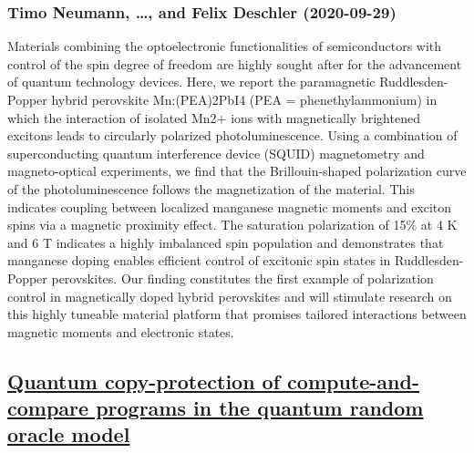 \subsubsection*{Timo Neumann, \dots, and Felix Deschler (2020-09-29)}
Materials combining the optoelectronic functionalities of semiconductors with
control of the spin degree of freedom are highly sought after for the
advancement of quantum technology devices. Here, we report the paramagnetic
Ruddlesden-Popper hybrid perovskite Mn:(PEA)2PbI4 (PEA = phenethylammonium) in
which the interaction of isolated Mn2+ ions with magnetically brightened
excitons leads to circularly polarized photoluminescence. Using a combination
of superconducting quantum interference device (SQUID) magnetometry and
magneto-optical experiments, we find that the Brillouin-shaped polarization
curve of the photoluminescence follows the magnetization of the material. This
indicates coupling between localized manganese magnetic moments and exciton
spins via a magnetic proximity effect. The saturation polarization of 15\% at 4
K and 6 T indicates a highly imbalanced spin population and demonstrates that
manganese doping enables efficient control of excitonic spin states in
Ruddlesden-Popper perovskites. Our finding constitutes the first example of
polarization control in magnetically doped hybrid perovskites and will
stimulate research on this highly tuneable material platform that promises
tailored interactions between magnetic moments and electronic states.

\subsection*{\href{http://arxiv.org/abs/2009.13865v1}{Quantum copy-protection of compute-and-compare programs in the quantum  random oracle model}}
